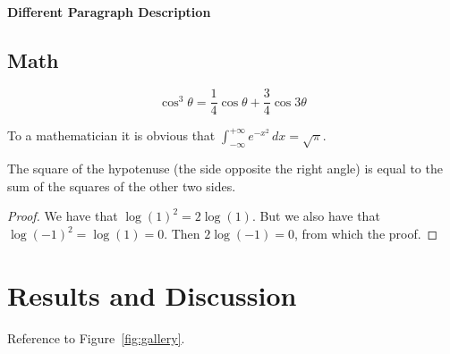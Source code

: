 \documentclass[
10pt, %
a4paper, %
oneside, %
headinclude,footinclude, %
BCOR5mm, %
]{scrartcl}
\begin{document}
\paragraph{Different Paragraph Description} \lipsum[8] %


\subsection{Math}

\lipsum[4] %

\begin{equation}
\cos^3 \theta =\frac{1}{4}\cos\theta+\frac{3}{4}\cos 3\theta
\label{eq:refname2}
\end{equation}

\lipsum[5] %

\begin{definition}[Gauss] 
To a mathematician it is obvious that
$\int_{-\infty}^{+\infty}
e^{-x^2}\,dx=\sqrt{\pi}$. 
\end{definition} 

\begin{theorem}[Pythagoras]
The square of the hypotenuse (the side opposite the right angle) is equal to the sum of the squares of the other two sides.
\end{theorem}

\begin{proof} 
We have that $\log(1)^2 = 2\log(1)$.
But we also have that $\log(-1)^2=\log(1)=0$.
Then $2\log(-1)=0$, from which the proof.
\end{proof}


\section{Results and Discussion}

Reference to Figure~\vref{fig:gallery}. %

\end{document}
